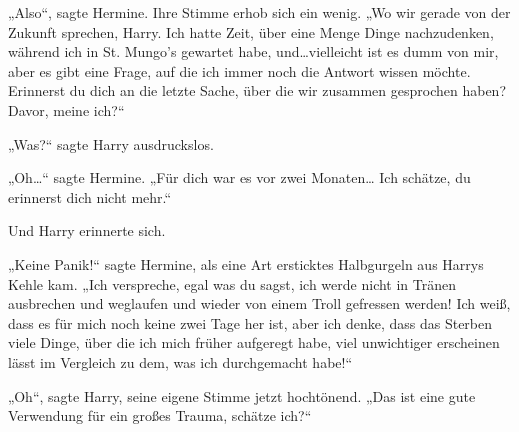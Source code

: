 „Also“, sagte Hermine. Ihre Stimme erhob sich ein wenig. „Wo wir gerade von der Zukunft sprechen, Harry. Ich hatte Zeit, über eine Menge Dinge nachzudenken, während ich in St. Mungo’s gewartet habe, und…vielleicht ist es dumm von mir, aber es gibt eine Frage, auf die ich immer noch die Antwort wissen möchte.
Erinnerst du dich an die letzte Sache, über die wir zusammen gesprochen haben? Davor, meine ich?“

„Was?“ sagte Harry ausdruckslos.

„Oh…“ sagte Hermine. „Für dich war es vor zwei Monaten… Ich schätze, du erinnerst dich nicht mehr.“

Und Harry erinnerte sich.

„Keine Panik!“ sagte Hermine, als eine Art ersticktes Halbgurgeln aus Harrys Kehle kam. „Ich verspreche, egal was du sagst, ich werde nicht in Tränen ausbrechen und weglaufen und wieder von einem Troll gefressen werden! Ich weiß, dass es für mich noch keine zwei Tage her ist, aber ich denke, dass das Sterben viele Dinge, über die ich mich früher aufgeregt habe, viel unwichtiger erscheinen lässt im Vergleich zu dem, was ich durchgemacht habe!“

„Oh“, sagte Harry, seine eigene Stimme jetzt hochtönend. „Das ist eine gute Verwendung für ein großes Trauma, schätze ich?“

